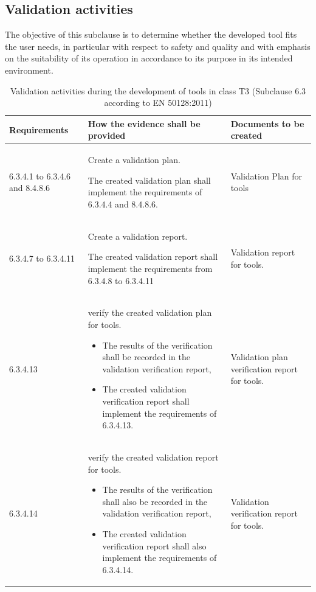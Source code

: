 \documentclass{template/openetcs_report}
\begin{document}
\subsection{Validation activities}
\begin{flushleft}
The objective of this subclause is to determine whether the developed tool fits the user needs, in particular with respect to safety and quality and with emphasis on the suitability of its operation in accordance to its purpose in its intended environment.
\end{flushleft}
{\footnotesize\sffamily\centering
\begin{longtable}{|p{2cm}|p{9cm}|p{3cm}|}
\caption{Validation activities during the development of tools in class T3 (Subclause 6.3 according to EN 50128:2011)}\\
\hline
\bfseries Requirements & \bfseries How the evidence shall be provided & \bfseries Documents to be created\\
\hline
\hline
\endhead
\hline
\endfoot

6.3.4.1 to 6.3.4.6 and 8.4.8.6 & Create a validation plan.

The created validation plan shall implement the requirements of 6.3.4.4 and 8.4.8.6.
& Validation Plan for tools\\ 
\hline
6.3.4.7 to 6.3.4.11 & Create a validation report.

The created validation report shall implement the requirements from 6.3.4.8 to 6.3.4.11
& Validation report for tools.\\ 
\hline
6.3.4.13 & verify the created validation plan for tools. 
\begin{itemize}\itemsep=0pt
  \item The results of the verification shall be recorded in the validation verification report,
  \item The created validation verification report shall implement the requirements of 6.3.4.13. 
\end{itemize}
& Validation plan verification report for tools.\\ 
\hline
6.3.4.14 & verify the created validation report for tools. 
\begin{itemize}\itemsep=0pt
  \item The results of the verification shall also be recorded in the validation verification report,
  \item The created validation verification report shall also implement the requirements of 6.3.4.14. 
\end{itemize}
& Validation verification report for tools.\\ 
\hline
\end{longtable}}
\end{document}
